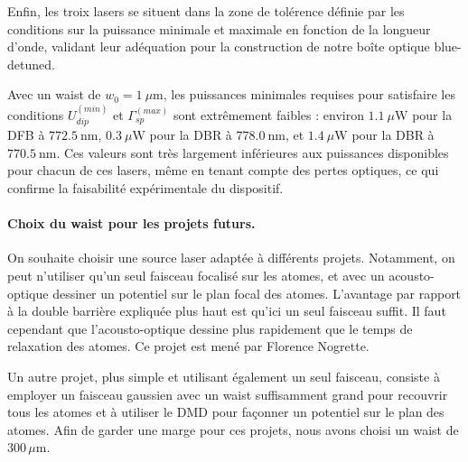 Enfin, les troix lasers  se situent dans la zone de tolérence définie par les conditions sur la puissance minimale et maximale en fonction de la longueur d’onde, validant leur adéquation pour la construction de notre boîte optique blue-detuned.

\medskip

Avec un waist de $w_0 = 1~\mu\text{m}$, les puissances minimales requises pour satisfaire les conditions $U_{dip}^{(min)}$ et $\Gamma_{sp}^{(max)}$ sont extrêmement faibles : environ $1.1~\mu\text{W}$ pour la DFB à $772.5~\text{nm}$, $0.3~\mu\text{W}$ pour la DBR à $778.0~\text{nm}$, et $1.4~\mu\text{W}$ pour la DBR à $770.5~\text{nm}$. Ces valeurs sont très largement inférieures aux puissances disponibles pour chacun de ces lasers, même en tenant compte des pertes optiques, ce qui confirme la faisabilité expérimentale du dispositif.

\paragraph{Choix du waist pour les projets futurs.}

On souhaite choisir une source laser adaptée à différents projets. 
Notamment, on peut n’utiliser qu’un seul faisceau focalisé sur les atomes, et avec un acousto-optique dessiner un potentiel sur le plan focal des atomes. 
L’avantage par rapport à la double barrière expliquée plus haut est qu’ici un seul faisceau suffit. 
Il faut cependant que l’acousto-optique dessine plus rapidement que le temps de relaxation des atomes. 
Ce projet est mené par Florence Nogrette. 

\medskip

Un autre projet, plus simple et utilisant également un seul faisceau, consiste à employer un faisceau gaussien avec un waist suffisamment grand pour recouvrir tous les atomes et à utiliser le DMD pour façonner un potentiel sur le plan des atomes. 
Afin de garder une marge pour ces projets, nous avons choisi un waist de $300\,\mu\mathrm{m}$.
 




